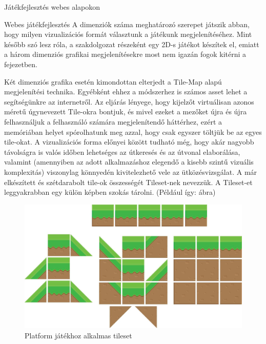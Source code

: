 \begin{MyChapter}{Játékfejlesztés webes alapokon}
\begin{MySection}{Webes játékfejlesztés}
		A dimenziók száma meghatározó szerepet játszik abban, hogy milyen vizualizációs formát választunk a játékunk megjelenítéséhez. Mint később szó lesz róla, a szakdolgozat részeként egy 2D-s játékot készítek el, emiatt a három dimenziós grafikai megjelenítésekre most nem igazán fogok kitérni a fejezetben.
		
		Két dimenziós grafika esetén kimondottan elterjedt a Tile-Map alapú megjelenítési technika. Egyébként ehhez a módszerhez is számos asset lehet a segítségünkre az internetről. Az eljárás lényege, hogy kijelzőt virtuálisan azonos méretű úgynevezett Tile-okra bontjuk, és mivel ezeket a mezőket újra és újra felhasználjuk a felhasználó számára megjelenítendő háttérhez, ezért a memóriában helyet spórolhatunk meg azzal, hogy csak egyszer töltjük be az egyes tile-okat. A vizualizációs forma előnyei között tudható még, hogy akár nagyobb távolságra is valós időben lehetséges az útkeresés és az útvonal elaborálása, valamint (amennyiben az adott alkalmazáshoz elegendő a kisebb szintű vizuális komplexitás) viszonylag könnyedén kivitelezhető vele az ütközésvizsgálat.
		\cite{mileff}
		A már elkészített és szétdarabolt tile-ok összességét Tileset-nek nevezzük. A Tileset-et leggyakrabban egy külön képben szokás tárolni. (Például így:  ábra)
		\cite{tileset}
		\begin{figure}[H]
			\centering
			\includegraphics[scale=0.2]{kepek/tileMap/TileSet.png}
			\caption{Platform játékhoz alkalmas tileset}
			\label{fig:tileMap:tileSet}
		\end{figure}
	

\end{MySection}
\end{MyChapter}
